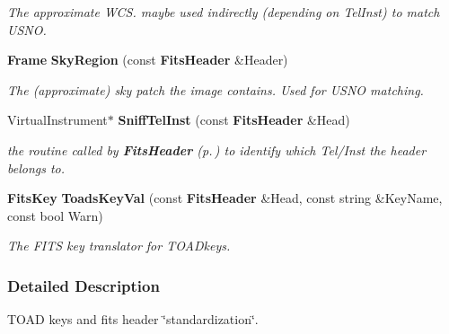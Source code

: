 \begin{CompactItemize}
\begin{CompactList}\small\item\em The approximate WCS. maybe used indirectly (depending on Tel\-Inst) to match USNO.\item\end{CompactList}\item 
{}
{\bf Frame} {\bf Sky\-Region} (const {\bf Fits\-Header} \&Header)\label{fitstoad_cc_a32}

\begin{CompactList}\small\item\em The (approximate) sky patch the image contains. Used for USNO matching.\item\end{CompactList}\item 
{}
Virtual\-Instrument$\ast$ {\bf Sniff\-Tel\-Inst} (const {\bf Fits\-Header} \&Head)\label{fitstoad_cc_a33}

\begin{CompactList}\small\item\em the routine called by {\bf Fits\-Header} {\rm (p.\,\pageref{class_fitsheader})} to identify which Tel/Inst the header belongs to.\item\end{CompactList}\item 
{}
{\bf Fits\-Key} {\bf Toads\-Key\-Val} (const {\bf Fits\-Header} \&Head, const string \&Key\-Name, const bool Warn)\label{fitstoad_cc_a37}

\begin{CompactList}\small\item\em The FITS key translator for TOADkeys.\item\end{CompactList}\end{CompactItemize}


\subsubsection{Detailed Description}
TOAD keys and fits header \char`\"{}standardization\char`\"{}.





